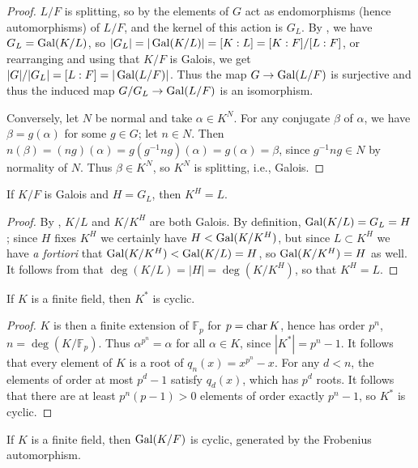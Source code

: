 \begin{proof} $L/F$ is splitting, so by  the elements of $G$
act as endomorphisms (hence automorphisms) of $L/F$, and the kernel of this action is $G_L$.  By
, we have $G_L = \operatorname{\text{Gal}}(K/L)$, so $|G_L| = |\operatorname{\text{Gal}}(K/L)| = [K : L] = [K : F] / [L : F]$,
or rearranging and using that $K/F$ is Galois, we get $|G|/|G_L| = [L : F] =
|\operatorname{\text{Gal}}(L/F)|$.  Thus the map $G \to \operatorname{\text{Gal}}(L/F)$ is surjective and thus the induced map $G/G_L \to
\operatorname{\text{Gal}}(L/F)$ is an isomorphism.

Conversely, let $N$ be normal and take $\alpha \in K^N$.  For any conjugate $\beta$ of $\alpha$, we
have $\beta = g(\alpha)$ for some $g \in G$; let $n \in N$.  Then $n(\beta) = (ng)(\alpha) =
g(g^{-1} n g)(\alpha) = g(\alpha) = \beta$, since $g^{-1} n g \in N$ by normality of $N$.  Thus
$\beta \in K^N$, so $K^N$ is splitting, i.e., Galois. \end{proof}

\begin{proposition} If $K/F$ is Galois and $H = G_L$, then $K^H = L$.
\label{fixed_field}
\end{proposition}

\begin{proof} By , $K/L$ and $K/K^H$ are both Galois.  By
definition, $\operatorname{\text{Gal}}(K/L) = G_L = H$; since $H$ fixes $K^H$ we certainly have
$H < \operatorname{\text{Gal}}(K/K^H)$, but since $L \subset K^H$ we have \emph{a fortiori} that
$\operatorname{\text{Gal}}(K/K^H) < \operatorname{\text{Gal}}(K/L) = H$, so $\operatorname{\text{Gal}}(K/K^H) = H$ as well.  It follows
from  that $\deg(K/L) = |H| = \deg(K/K^H)$, so that $K^H =
L$. \end{proof}

\begin{lemma} If $K$ is a finite field, then $K^\ast$ is cyclic.
\label{fin_cyclic}
\end{lemma}

\begin{proof} $K$ is then a finite extension of $\mathbb{F}_p$ for $p =
\operatorname{\text{char}}{K}$, hence has order $p^n$, $n = \deg(K/\mathbb{F}_p)$.  Thus
$\alpha^{p^n} = \alpha$ for all $\alpha \in K$, since $|K^\ast| = p^n - 1$.
It follows that every element of $K$ is a root of $q_n(x) = x^{p^n} - x$.  For
any $d < n$, the elements of order at most $p^d - 1$ satisfy $q_d(x)$, which has
$p^d$ roots.  It follows that there are at least $p^n(p - 1) > 0$ elements of
order exactly $p^n - 1$, so $K^\ast$ is cyclic. \end{proof}

\begin{corollary} If $K$ is a finite field, then $\operatorname{\text{Gal}}(K/F)$ is cyclic, generated by
the Frobenius automorphism.
\label{fin_gal_cyclic}
\end{corollary}

